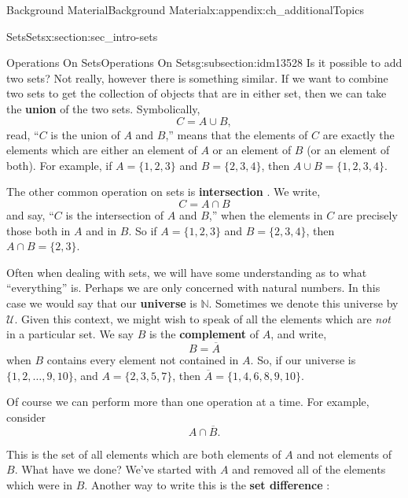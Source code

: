 \documentclass[oneside,10pt,]{book}
\newcommand{\terminology}[1]{\textbf{#1}}
\numberwithin{equation}{chapter}
\def\N{\mathbb N}
\def\U{\mathcal U}
\begin{document}
\begin{appendixptx}{Background Material}{}{Background Material}{}{}{x:appendix:ch_additionalTopics}
\begin{sectionptx}{Sets}{}{Sets}{}{}{x:section:sec_intro-sets}
%
%
\typeout{************************************************}
\typeout{************************************************}
%
\begin{subsectionptx}{Operations On Sets}{}{Operations On Sets}{}{}{g:subsection:idm13528}
Is it possible to add two sets? Not really, however there is something similar. If we want to combine two sets to get the collection of objects that are in either set, then we can take the \terminology{union}  of the two sets. Symbolically,%
\begin{equation*}
C = A \cup B,
\end{equation*}
read, ``\(C\) is the union of \(A\) and \(B\),'' means that the elements of \(C\) are exactly the elements which are either an element of \(A\) or an element of \(B\) (or an element of both). For example, if \(A = \{1, 2, 3\}\) and \(B = \{2, 3, 4\}\), then \(A \cup B = \{1, 2, 3, 4\}\).%
\par
The other common operation on sets is \terminology{intersection} . We write,%
\begin{equation*}
C = A \cap B
\end{equation*}
and say, ``\(C\) is the intersection of \(A\) and \(B\),'' when the elements in \(C\) are precisely those both in \(A\) and in \(B\). So if \(A = \{1, 2, 3\}\) and \(B = \{2, 3, 4\}\), then \(A \cap B = \{2, 3\}\).%
\par
Often when dealing with sets, we will have some understanding as to what ``everything'' is. Perhaps we are only concerned with natural numbers. In this case we would say that our \terminology{universe} is \(\N\). Sometimes we denote this universe by \(\U\). Given this context, we might wish to speak of all the elements which are \emph{not} in a particular set. We say \(B\) is the \terminology{complement}  of \(A\), and write,%
\begin{equation*}
B = \overline A
\end{equation*}
when \(B\) contains every element not contained in \(A\). So, if our universe is \(\{1, 2,\ldots, 9, 10\}\), and \(A = \{2, 3, 5, 7\}\), then \(\overline A = \{1, 4, 6, 8, 9,10\}\).%
\par
Of course we can perform more than one operation at a time. For example, consider%
\begin{equation*}
A \cap \overline B.
\end{equation*}
%
\par
This is the set of all elements which are both elements of \(A\) and not elements of \(B\). What have we done? We've started with \(A\) and removed all of the elements which were in \(B\). Another way to write this is the \terminology{set difference}  :%

\end{subsectionptx}
\end{sectionptx}
\end{appendixptx}
\end{document}
